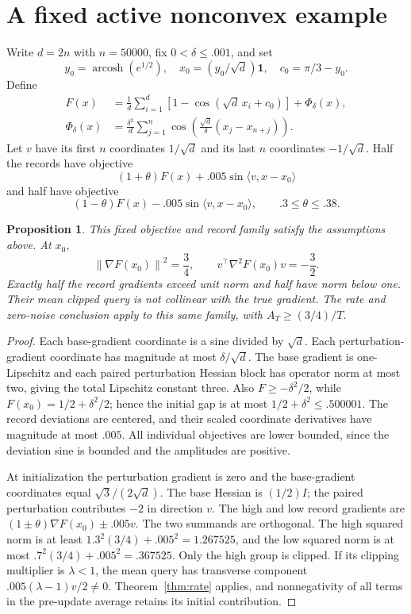 \documentclass[11pt]{article}
\newtheorem{proposition}[theorem]{Proposition}
\newcommand{\norm}[1]{\left\|#1\right\|}
\begin{document}
\section{A fixed active nonconvex example}\label{sec:example}
Write $d=2n$ with $n=50000$, fix $0<\delta\le .001$, and set
\[
 y_0=\operatorname{arcosh}(e^{1/2}),\quad
 x_0=(y_0/\sqrt d)\mathbf1,\quad c_0=\pi/3-y_0.
\]
Define
\begin{align*}
 F(x)&=\frac1d\sum_{i=1}^d[1-\cos(\sqrt d\,x_i+c_0)]+\Phi_\delta(x),\\
 \Phi_\delta(x)&=\frac{\delta^2}{d}
  \sum_{j=1}^n\cos\left(\frac{\sqrt d}{\delta}(x_j-x_{n+j})\right).
\end{align*}
Let $v$ have its first $n$ coordinates $1/\sqrt d$ and its last $n$
coordinates $-1/\sqrt d$. Half the records have objective
\[
 (1+\theta)F(x)+.005\sin\langle v,x-x_0\rangle
\]
and half have objective
\[
 (1-\theta)F(x)-.005\sin\langle v,x-x_0\rangle,
 \qquad .3\le\theta\le .38 .
\]
\begin{proposition}\label{prop:example}
This fixed objective and record family satisfy the assumptions above.
At $x_0$,
\[
 \norm{\nabla F(x_0)}^2=\frac34,\qquad
 v^\top\nabla^2F(x_0)v=-\frac32 .
\]
Exactly half the record gradients exceed unit norm and half have norm below
one. Their mean clipped query is not collinear with the true gradient.
The rate and zero-noise conclusion apply to this same family, with
$A_T\ge(3/4)/T$.
\end{proposition}
\begin{proof}
Each base-gradient coordinate is a sine divided by $\sqrt d$.
Each perturbation-gradient coordinate has magnitude at most $\delta/\sqrt d$.
The base gradient is one-Lipschitz and each paired perturbation Hessian block
has operator norm at most two, giving the total Lipschitz constant three.
Also $F\ge-\delta^2/2$, while $F(x_0)=1/2+\delta^2/2$; hence the initial
gap is at most $1/2+\delta^2\le.500001$.
The record deviations are centered, and their scaled coordinate derivatives
have magnitude at most $.005$. All individual objectives are lower bounded,
since the deviation sine is bounded and the amplitudes are positive.

At initialization the perturbation gradient is zero and the base-gradient
coordinates equal $\sqrt3/(2\sqrt d)$. The base Hessian is $(1/2)I$;
the paired perturbation contributes $-2$ in direction $v$.
The high and low record gradients are $(1\pm\theta)\nabla F(x_0)\pm.005v$.
The two summands are orthogonal. The high squared norm is at least
$1.3^2(3/4)+.005^2=1.267525$, and the low squared norm is at most
$.7^2(3/4)+.005^2=.367525$.
Only the high group is clipped. If its clipping multiplier is $\lambda<1$,
the mean query has transverse component $.005(\lambda-1)v/2\ne0$.
Theorem~\ref{thm:rate} applies, and nonnegativity of all terms in the
pre-update average retains its initial contribution.
\end{proof}
\end{document}
